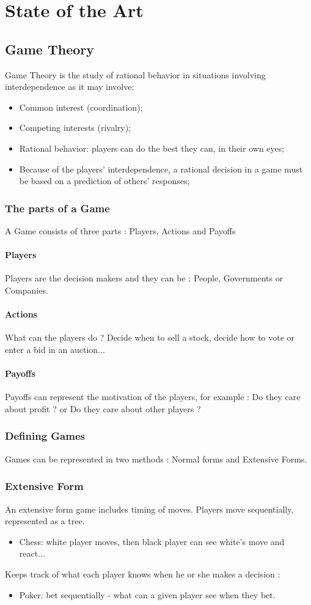 \documentclass[10pt,a4paper]{report}
\begin{document}
\chapter{State of the Art}
\section{Game Theory}
Game Theory is the study of rational behavior in situations involving interdependence as it may involve:
\begin{itemize}
\item Common interest (coordination);
\item Competing interests (rivalry);
\item Rational behavior: players can do the best they can, in their own eyes;
\item Because of the players' interdependence, a rational decision in a game must be based on a prediction of others' responses;
\end{itemize}
\subsection{The parts of a Game} 
A Game consists of three parts : 
Players, Actions and Payoffs
\subsubsection{Players}
Players are the decision makers and they can be : People, Governments or Companies.
\subsubsection{Actions}
What can the players do ?
Decide when to sell a stock, decide how to vote or enter a bid in an auction...
\subsubsection{Payoffs}
Payoffs can represent the motivation of the players, for example : Do they care about profit ? or Do they care about other players ? 
\subsection{Defining Games} Games can be represented in two methods : Normal forms and Extensive Forms.
\subsection{Extensive Form}
An extensive form game includes timing of moves. 
Players move sequentially, represented as a tree.
\begin{itemize}
\item Chess: white player moves, then black player can see white's move and react...
\end{itemize}
Keeps track of what each player knows when he or she makes a decision :
\begin{itemize}
\item Poker: bet sequentially - what can a given player see when they bet. 
\end{itemize}
\end{document}
